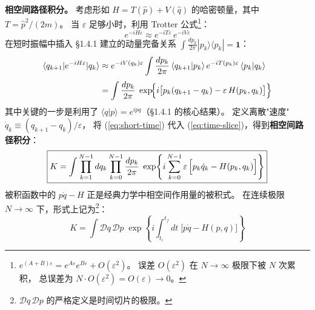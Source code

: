 \vspace{8pt}
\noindent\textbf{相空间路径积分。}
考虑形如 $H = T(\hat{p}) + V(\hat{q})$ 的哈密顿量，其中 $T = \hat{p}^2/(2m)$。
当 $\varepsilon$ 足够小时，利用 Trotter 公式\footnote{
$e^{(A+B)\varepsilon} = e^{A\varepsilon}e^{B\varepsilon} + O(\varepsilon^2)$。
误差 $O(\varepsilon^2)$ 在 $N\to\infty$ 极限下被 $N$ 次累积，
总误差为 $N \cdot O(\varepsilon^2) = O(\varepsilon) \to 0$。}：
\begin{equation}
  e^{-iH\varepsilon} \approx e^{-iT\varepsilon}\,e^{-iV\varepsilon}
\end{equation}
在短时振幅中插入 \S1.4.1 建立的动量完备关系
$\int\frac{dp_k}{2\pi}|p_k\rangle\langle p_k| = \mathbf{1}$：
\begin{align}
  \langle q_{k+1}|e^{-iH\varepsilon}|q_k\rangle
  &\approx
  e^{-iV(q_k)\varepsilon}\int\frac{dp_k}{2\pi}\,
  \langle q_{k+1}|p_k\rangle\,e^{-iT(p_k)\varepsilon}\,\langle p_k|q_k\rangle
  \notag\\[3pt]
  &= \int\frac{dp_k}{2\pi}\;
     \exp\!\Bigl\{
       i\bigl[p_k(q_{k+1}-q_k) - \varepsilon\,H(p_k, q_k)\bigr]
     \Bigr\}
  \label{eq:short-time}
\end{align}
其中关键的一步是利用了 $\langle q|p\rangle = e^{ipq}$（\S1.4.1 的核心结果）。
定义离散"速度" $\dot{q}_k \equiv (q_{k+1} - q_k)/\varepsilon$，
将 (\ref{eq:short-time}) 代入 (\ref{eq:time-slice})，得到\textbf{相空间路径积分}：
\begin{equation}\label{eq:phase-PI}
\boxed{
  K = \int\prod_{k=1}^{N-1}dq_k\prod_{k=0}^{N-1}\frac{dp_k}{2\pi}\;
  \exp\!\left\{
    i\sum_{k=0}^{N-1}\varepsilon\,
    \Bigl[p_k\dot{q}_k - H(p_k, q_k)\Bigr]
  \right\}
}
\end{equation}
被积函数中的 $p\dot{q} - H$ 正是经典力学中相空间作用量的被积式。
在连续极限 $N\to\infty$ 下，形式上记为\footnote{
$\mathcal{D}q\,\mathcal{D}p$ 的严格定义是时间切片的极限。}：
\[
  K = \int\mathcal{D}q\,\mathcal{D}p\;
  \exp\!\left\{i\int_{t_i}^{t_f}\!dt\;\bigl[p\dot{q} - H(p,q)\bigr]\right\}
\]

